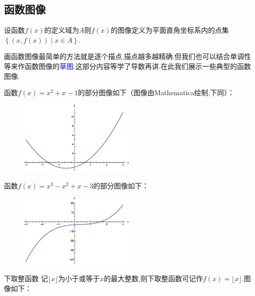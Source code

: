\documentclass[lang=cn,math=cm,chinesefont=nofont,11pt,scheme=chinese,twocol]{elegantbook}
\begin{document}
\subsection{函数图像}

\begin{definition}
  设函数$f(x)$的定义域为$A$则$f(x)$的图像定义为平面直角坐标系内的点集$\left\{(x,f(x))\mid x\in A\right\}$.
\end{definition}

画函数图像最简单的方法就是逐个描点,描点越多越精确.但我们也可以结合单调性等来作函数图像的\textcolor{blue}{草图}.这部分内容等学了导数再讲.在此我们展示一些典型的函数图像.

\begin{example}
  函数$f(x)=x^2+x-1$的部分图像如下（图像由Mathematica绘制,下同）：
\end{example}

\begin{figure}[h]
  \centering
  \includegraphics[width=0.5\textwidth]{image/2.1.5function1.eps}
  \label{img:2.1.5function1}
\end{figure}

\begin{example}
  函数$f(x)=x^3-x^2+x-3$的部分图像如下：
\end{example}

\begin{figure}[h]
  \centering
  \includegraphics[width=0.5\textwidth]{image/2.1.5function2.eps}
  \label{img:2.1.5function2}
\end{figure}

\begin{example}{下取整函数}
  记$\lfloor x\rfloor $为小于或等于$x$的最大整数,则下取整函数可记作$f(x)=\lfloor x\rfloor$.图像如下：
\end{example}
\end{document}

